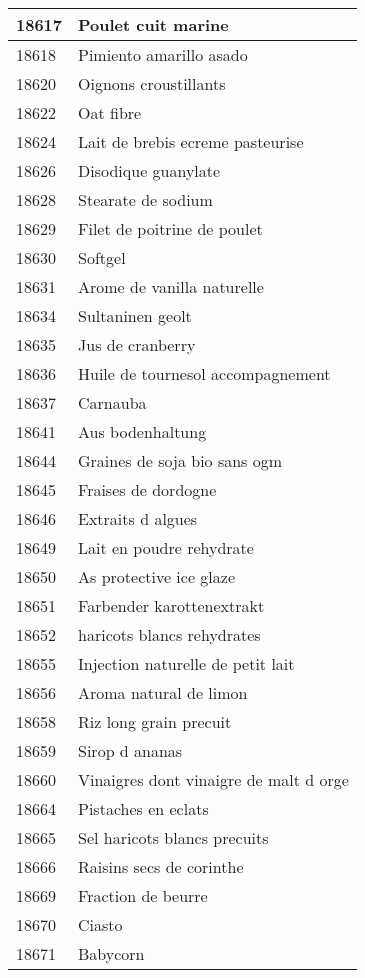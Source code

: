 \begin{longtable}{|l|l|}
18617 & Poulet cuit marine \\ \hline 
18618 & Pimiento amarillo asado \\ \hline 
18620 & Oignons croustillants \\ \hline 
18622 & Oat fibre \\ \hline 
18624 & Lait de brebis ecreme pasteurise \\ \hline 
18626 & Disodique guanylate \\ \hline 
18628 & Stearate de sodium \\ \hline 
18629 & Filet de poitrine de poulet \\ \hline 
18630 & Softgel \\ \hline 
18631 & Arome de vanilla naturelle \\ \hline 
18634 & Sultaninen geolt \\ \hline 
18635 & Jus de cranberry \\ \hline 
18636 & Huile de tournesol accompagnement \\ \hline 
18637 & Carnauba \\ \hline 
18641 & Aus bodenhaltung \\ \hline 
18644 & Graines de soja bio sans ogm \\ \hline 
18645 & Fraises de dordogne \\ \hline 
18646 & Extraits d algues \\ \hline 
18649 & Lait en poudre rehydrate \\ \hline 
18650 & As protective ice glaze \\ \hline 
18651 & Farbender karottenextrakt \\ \hline 
18652 & haricots blancs rehydrates \\ \hline 
18655 & Injection naturelle de petit lait \\ \hline 
18656 & Aroma natural de limon \\ \hline 
18658 & Riz long grain precuit \\ \hline 
18659 & Sirop d ananas \\ \hline 
18660 & Vinaigres dont vinaigre de malt d orge \\ \hline 
18664 & Pistaches en eclats \\ \hline 
18665 & Sel haricots blancs precuits \\ \hline 
18666 & Raisins secs de corinthe \\ \hline 
18669 & Fraction de beurre \\ \hline 
18670 & Ciasto \\ \hline 
18671 & Babycorn \\ \hline 

\end{longtable}
